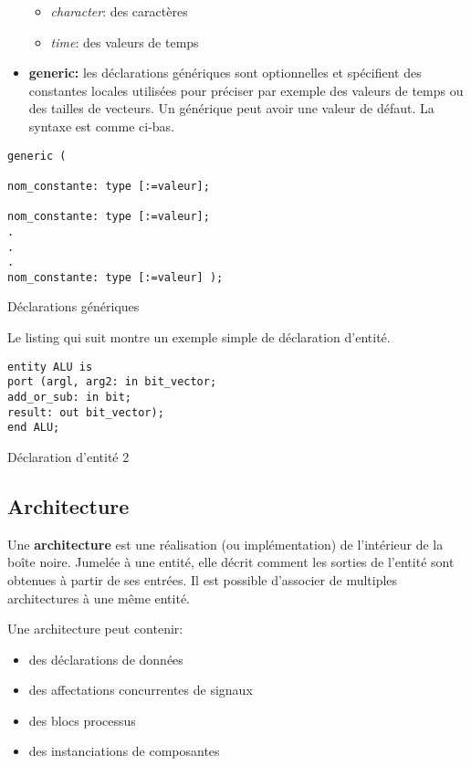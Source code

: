 \documentclass[11pt]{article}
\begin{document}
\begin{itemize}
\begin{itemize}
\item \emph{character}: des caractères

\item \emph{time}: des valeurs de temps
\end{itemize}

\item \textbf{generic:} les déclarations génériques sont optionnelles et
spécifient des constantes locales utilisées pour préciser par
exemple des valeurs de temps ou des tailles de vecteurs. Un
générique peut avoir une valeur de défaut. La syntaxe est comme ci-bas.
\end{itemize}

\begin{listing}[htbp]
\begin{verbatim}
generic (

nom_constante: type [:=valeur];

nom_constante: type [:=valeur];
.
.
.
nom_constante: type [:=valeur] );
\end{verbatim}
\caption{Déclarations génériques}
\end{listing}


Le listing qui suit montre un exemple simple de déclaration d'entité. 

\begin{listing}[htbp]
\begin{verbatim}
entity ALU is
port (argl, arg2: in bit_vector;
add_or_sub: in bit;
result: out bit_vector);
end ALU;
\end{verbatim}
\caption{Déclaration d'entité 2}
\end{listing}

\subsection{Architecture}
\label{sec:org032f1e4}

Une \textbf{architecture} est une réalisation (ou implémentation) de
l'intérieur de la boîte noire. Jumelée à une entité, elle décrit
comment les sorties de l'entité sont obtenues à partir de ses
entrées. Il est possible d'associer de multiples architectures à une
même entité.

Une architecture peut contenir:

\begin{itemize}
\item des déclarations de données

\item des affectations concurrentes de signaux

\item des blocs processus

\item des instanciations de composantes
\end{itemize}
\end{document}
